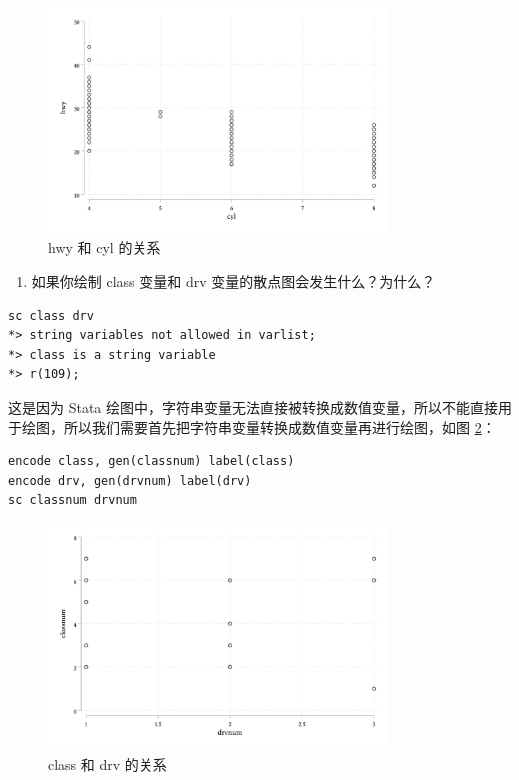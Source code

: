 \documentclass[]{ctexbook}
\providecommand{\tightlist}{%
  \setlength{\itemsep}{0pt}\setlength{\parskip}{0pt}}
\begin{document}
\begin{figure}

{\centering \includegraphics[width=0.8\textwidth]{assets/hwycyl} 

}

\caption{hwy 和 cyl 的关系}\label{fig:hwycyl}
\end{figure}

\begin{enumerate}
\def\labelenumi{\arabic{enumi}.}
\setcounter{enumi}{4}
\tightlist
\item
  如果你绘制 class 变量和 drv 变量的散点图会发生什么？为什么？
\end{enumerate}

\begin{lstlisting}
sc class drv
*> string variables not allowed in varlist;
*> class is a string variable
*> r(109);
\end{lstlisting}

这是因为 Stata 绘图中，字符串变量无法直接被转换成数值变量，所以不能直接用于绘图，所以我们需要首先把字符串变量转换成数值变量再进行绘图，如图 \ref{fig:classnumdrvnum}：

\begin{lstlisting}
encode class, gen(classnum) label(class)
encode drv, gen(drvnum) label(drv)
sc classnum drvnum
\end{lstlisting}

\begin{figure}

{\centering \includegraphics[width=0.8\textwidth]{assets/classnumdrvnum} 

}

\caption{class 和 drv 的关系}\label{fig:classnumdrvnum}
\end{figure}
\end{document}
